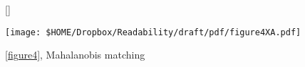 \begin{figure}[H]
	
	[\FBwidth]
	{
		\caption{\autoref{figure4}, Mahalanobis matching}\label{figure4XA}
	}
	{
		\texttt{[image: \$HOME/Dropbox/Readability/draft/pdf/figure4XA.pdf]}
	}
\end{figure}